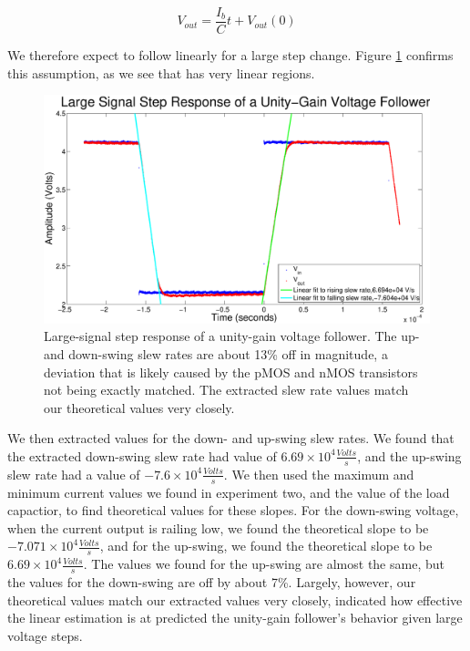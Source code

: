 \begin{equation}
V_{out} = \frac{I_b}{C}t + V_{out}(0)
\end{equation}	

We therefore expect \Vout to follow \Vin linearly for a large step change. Figure \ref{fig:exp3p1} confirms this assumption, as we see that \Vout has very linear regions.

\begin{figure}[H]
\centering
\includegraphics[width=\linewidth]{../Figures/Exp3P1.eps}
\caption{Large-signal step response of a unity-gain voltage follower. The up- and down-swing slew rates are about 13\% off in magnitude, a deviation that is likely caused by the pMOS and nMOS transistors not being exactly matched. The extracted slew rate values match our theoretical values very closely.}
\label{fig:exp3p1}
\end{figure}

We then extracted values for the down- and up-swing slew rates. We found that the extracted down-swing slew rate had value of $6.69 \times 10^4 \frac{Volts}{s}$, and the up-swing slew rate had a value of $-7.6 \times 10^4 \frac{Volts}{s}$. We then used the maximum and minimum current values we found in experiment two, and the value of the load capactior, to find theoretical values for these slopes. For the down-swing voltage, when the current output is railing low, we found the theoretical slope to be $-7.071 \times 10^4 \frac{Volts}{s}$, and for the up-swing, we found the theoretical slope to be $6.69 \times 10^4 \frac{Volts}{s}$. The values we found for the up-swing are almost the same, but the values for the down-swing are off by about 7\%. Largely, however, our theoretical values match our extracted values very closely, indicated how effective the linear estimation is at predicted the unity-gain follower's behavior given large voltage steps.